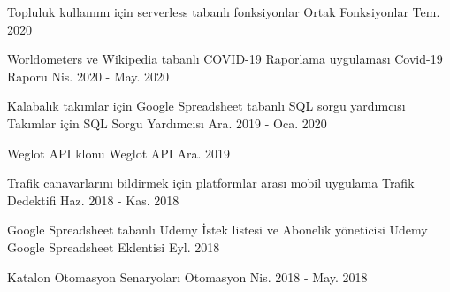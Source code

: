 

\begin{cventries}

  \cventry
    {Topluluk kullanımı için serverless tabanlı fonksiyonlar} %
    {Ortak Fonksiyonlar} %
    {} %
    {Tem. 2020} %
    {}

  \cventry
    {\href{https://www.worldometers.info/coronavirus}{Worldometers} ve \href{https://en.wikipedia.org/wiki/COVID-19_pandemic}{Wikipedia} tabanlı COVID-19 Raporlama uygulaması} %
    {Covid-19 Raporu} %
    {} %
    {Nis. 2020 - May. 2020} %
    {}

  \cventry
    {Kalabalık takımlar için Google Spreadsheet tabanlı SQL sorgu yardımcısı} %
    {Takımlar için SQL Sorgu Yardımcısı} %
    {} %
    {Ara. 2019 - Oca. 2020} %
    {}

  \cventry
    {Weglot API klonu} %
    {Weglot API} %
    {} %
    {Ara. 2019} %
    {}

  \cventry
    {Trafik canavarlarını bildirmek için platformlar arası mobil uygulama} %
    {Trafik Dedektifi} %
    {} %
    {Haz. 2018 - Kas. 2018} %
    {}

  \cventry
    {Google Spreadsheet tabanlı Udemy İstek listesi ve Abonelik yöneticisi} %
    {Udemy Google Spreadsheet Eklentisi} %
    {} %
    {Eyl. 2018} %
    {}

  \cventry
    {Katalon Otomasyon Senaryoları} %
    {Otomasyon} %
    {} %
    {Nis. 2018 - May. 2018} %
    {}


\end{cventries}
